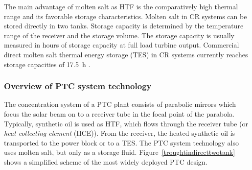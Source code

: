 The main advantage of molten salt as HTF is the comparatively high thermal range and its favorable storage characteristics. Molten salt in CR systems can be stored directly in two tanks. Storage capacity is determined by the temperature range of the receiver and the storage volume. The storage capacity is usually measured in hours of storage capacity at full load turbine output. Commercial direct molten salt thermal energy storage (TES) in CR systems currently reaches storage capacities of \SI{17.5}{\hour} \cite{NREL2015b}.

\subsubsection{Overview of PTC system technology} 
The concentration system of a PTC plant consists of parabolic mirrors which focus the solar beam on to a receiver tube in the focal point of the parabola. Typically, synthetic oil is used as HTF, which flows through the receiver tube (or \emph{heat collecting element} (HCE)). From the receiver, the heated synthetic oil is transported to the power block or to a TES. The PTC system technology also uses molten salt, but only as a storage fluid. Figure~\ref{troughtindirecttwotank} shows a simplified scheme of the most widely deployed PTC design.

